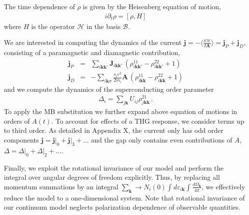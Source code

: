 \documentclass[aps,prb,reprint,noeprint,superscriptaddress]{revtex4-1}
\begin{document}
The time dependence of $\rho$ is given by the Heisenberg equation of motion,
\begin{eqnarray*}
  i\partial_t \rho = \left[ \rho, H \right]
\end{eqnarray*}
where $H$ is the operator $\mathcal{H}$ in the basis $\mathcal{B}$. 

We are interested in computing the dynamics of the current
$ \mathbf{j} = -\big\langle \frac{\delta \mathcal{H}}{\delta
\mathbf{A}}\big\rangle =
\mathbf{j}_P + \mathbf{j}_D$, consisting of a paramagnetic and diamagnetic
contribution,
\begin{eqnarray*}
  \mathbf{j}_P 
	&=&
  	\sum_{i\mathbf{kk'}}^{}
	\mathbf{J}_{i\mathbf{kk'}}\,
	\left( 
	  \rho_{i\mathbf{kk'}}^{11}
	  -\rho_{i\mathbf{kk'}}^{22}
	  +1
	\right)
	\\
  \mathbf{j}_D &=& -\sum_{i\mathbf{k}\sigma}^{} \frac{s_i e^2}{2m_i} 
  \mathbf{A} \,
	\left( 
	  \rho_{i\mathbf{kk}}^{11}
	  -\rho_{i\mathbf{kk}}^{22}
	  +1
	\right)
\end{eqnarray*}
and we compute the dynamics of the superconducting order parameter
\begin{eqnarray*}
  \Delta_i = \sum_{j\mathbf{k}}^{}U_{ij} 
  \rho_{j\mathbf{kk}}^{21} \,.
\end{eqnarray*}
To apply the MB substitution we further expand above equation of motions in
orders of $A(t)$. To account for effects of a THG response, we consider terms up to
third order. As detailed in Appendix X, the current only has odd order
components $\mathbf{j} = \mathbf{j}\big|_0 +\mathbf{j}\big|_3 + \dots$ and the
gap only contains even contributions of $A$, $\Delta = \Delta\big|_0 +
\Delta\big|_2 +\dots$. 

Finally, we exploit the rotational invariance of our model and perform the
integral over angular degrees of freedom explicitly. Thus, by replacing all momentum summations
by an integral 
$\sum_{\mathbf{k}}^{} \rightarrow
N_i(0)\int_{}^{}d\varepsilon_{i\mathbf{k}}\int_{}^{}
\frac{d\Omega_{\mathbf{k}}}{4\pi}$, we effectively reduce the model to a
one-dimensional system. Note that rotational invariance of our continuum model
neglects polarization dependence of observable quantities.
\end{document}
